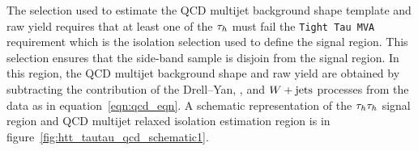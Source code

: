 
The selection used to estimate the QCD multijet background shape template and raw yield requires 
that at least one of the $\tau_{h}$
must fail the \texttt{Tight Tau MVA} requirement which is the isolation selection used to 
define the signal region. This selection
ensures that the side-band sample is disjoin from the signal region.
In this region, the QCD multijet background shape and raw yield are obtained
by subtracting the contribution of the Drell--Yan, \ttbar, and $W+\text{jets}$ processes
from the data as in equation~\ref{eqn:qcd_eqn}.
A schematic representation of the $\tau_{h}\tau_{h}$ signal region and QCD multijet relaxed
isolation estimation region is in figure~\ref{fig:htt_tautau_qcd_schematic1}.



